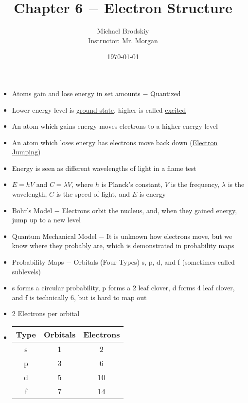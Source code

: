 \documentclass[12pt]{article}
\title{Chapter 6 $-$ Electron Structure}
\date{\today}
\author{Michael Brodskiy\\ \small Instructor: Mr. Morgan}
\begin{document}
\maketitle

\begin{itemize}

  \item Atoms gain and lose energy in set amounts $-$ Quantized

  \item Lower energy level is \underline{ground state}, higher is called \underline{excited}

  \item An atom which gains energy moves electrons to a higher energy level

  \item An atom which loses energy has electrons move back down (\underline{Electron Jumping})

  \item Energy is seen as different wavelengths of light in a flame test

  \item $E=hV$ and $C=\lambda V$, where $h$ is Planck's constant, $V$ is the frequency, $\lambda$ is the wavelength, $C$ is the speed of light, and $E$ is energy

  \item Bohr's Model $-$ Electrons orbit the nucleus, and, when they gained energy, jump up to a new level

  \item Quantum Mechanical Model $-$ It is unknown how electrons move, but we know where they probably are, which is demonstrated in probability maps

  \item Probability Maps $-$ Orbitals (Four Types) s, p, d, and f (sometimes called sublevels)

  \item s forms a circular probability, p forms a 2 leaf clover, d forms 4 leaf clover, and f is technically 6, but is hard to map out

  \item 2 Electrons per orbital

  \item \begin{tabular}{c c c}
      Type & Orbitals & Electrons\\
      \hline
      s & 1 & 2\\
      p & 3 & 6\\
      d & 5 & 10\\
      f & 7 & 14\\
    \end{tabular}


\end{itemize}
\end{document}
